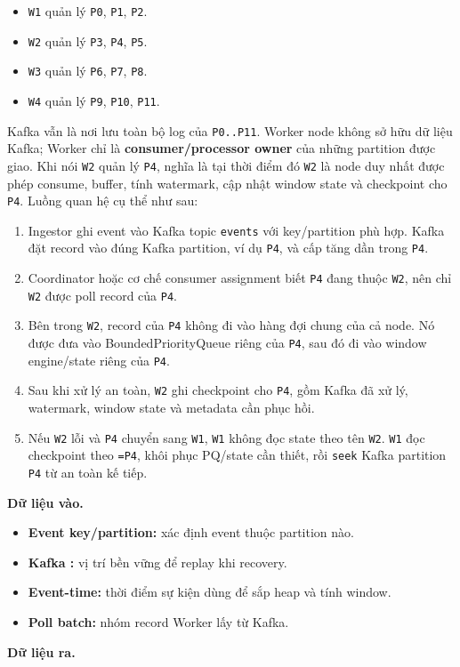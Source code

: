 \documentclass[12pt,a4paper]{article}
\begin{document}
\begin{itemize}
\item \texttt{W1} quản lý \texttt{P0}, \texttt{P1}, \texttt{P2}.
\item \texttt{W2} quản lý \texttt{P3}, \texttt{P4}, \texttt{P5}.
\item \texttt{W3} quản lý \texttt{P6}, \texttt{P7}, \texttt{P8}.
\item \texttt{W4} quản lý \texttt{P9}, \texttt{P10}, \texttt{P11}.
\end{itemize}
Kafka vẫn là nơi lưu toàn bộ log của \texttt{P0..P11}. Worker node không sở hữu dữ liệu Kafka; Worker chỉ là \textbf{consumer/processor owner} của những partition được giao. Khi nói \texttt{W2} quản lý \texttt{P4}, nghĩa là tại thời điểm đó \texttt{W2} là node duy nhất được phép consume, buffer, tính watermark, cập nhật window state và checkpoint  cho \texttt{P4}.
Luồng quan hệ cụ thể như sau:

\begin{enumerate}
\item Ingestor ghi event vào Kafka topic \texttt{events} với key/partition phù hợp. Kafka đặt record vào đúng Kafka partition, ví dụ \texttt{P4}, và cấp  tăng dần trong \texttt{P4}.
\item Coordinator hoặc cơ chế consumer assignment biết \texttt{P4} đang thuộc \texttt{W2}, nên chỉ \texttt{W2} được poll record của \texttt{P4}.
\item Bên trong \texttt{W2}, record của \texttt{P4} không đi vào hàng đợi chung của cả node. Nó được đưa vào BoundedPriorityQueue riêng của \texttt{P4}, sau đó đi vào window engine/state riêng của \texttt{P4}.
\item Sau khi xử lý an toàn, \texttt{W2} ghi checkpoint cho \texttt{P4}, gồm Kafka  đã xử lý, watermark, window state và metadata cần phục hồi.
\item Nếu \texttt{W2} lỗi và \texttt{P4} chuyển sang \texttt{W1}, \texttt{W1} không đọc state theo tên \texttt{W2}. \texttt{W1} đọc checkpoint theo \texttt{=P4}, khôi phục PQ/state cần thiết, rồi \texttt{seek} Kafka partition \texttt{P4} từ  an toàn kế tiếp.
\end{enumerate}
\textbf{Dữ liệu vào.}

\begin{itemize}
\item \textbf{Event key/partition:} xác định event thuộc partition nào.
\item \textbf{Kafka :} vị trí bền vững để replay khi recovery.
\item \textbf{Event-time:} thời điểm sự kiện dùng để sắp heap và tính window.
\item \textbf{Poll batch:} nhóm record Worker lấy từ Kafka.
\end{itemize}
\textbf{Dữ liệu ra.}
\end{document}
